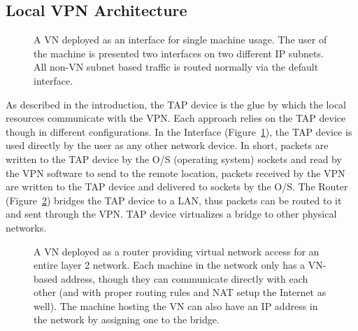 \subsection{Local VPN Architecture}

\begin{figure}
\centering
{}
\caption[VN Interface]{A VN deployed as an interface for single machine usage.
The user of the machine is presented two interfaces on two different IP subnets.
All non-VN subnet based traffic is routed normally via the default interface.}
\label{fig:interface}
\end{figure}

As described in the introduction, the TAP device is the glue by which the local
resources communicate with the VPN.  Each approach relies on the TAP device
though in different configurations.  In the Interface
(Figure~\ref{fig:interface}), the TAP device is used directly by the user as
any other network device.  In short, packets are written to the TAP device by
the O/S (operating system) sockets and read by the VPN software to send to the
remote location, packets received by the VPN are written to the TAP device and
delivered to sockets by the O/S.  The Router (Figure~\ref{fig:router}) bridges
the TAP device to a LAN, thus packets can be routed to it and sent through the
VPN.  TAP device virtualizes a bridge to other physical networks.  

\begin{figure}
\centering
{}
\caption[VN Router]{A VN deployed as a router providing virtual network access
for an entire layer 2 network.  Each machine in the network only has a VN-based
address, though they can communicate directly with each other (and with proper
routing rules and NAT setup the Internet as well).  The machine hosting the VN
can also have an IP address in the network by assigning one to the bridge.}
\label{fig:router}
\end{figure}

